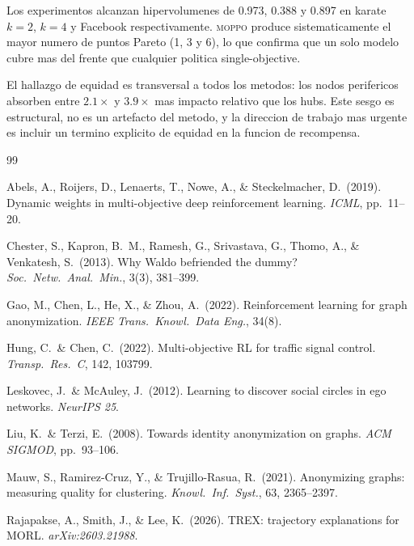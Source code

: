 \documentclass[10pt,twocolumn,letterpaper]{article}
\newcommand{\moppo}{\textsc{moppo}}
\begin{document}
Los experimentos alcanzan hipervolumenes de 0.973, 0.388 y 0.897 en karate $k=2$,
$k=4$ y Facebook respectivamente. \moppo{} produce sistematicamente el mayor numero
de puntos Pareto (1, 3 y 6), lo que confirma que un solo modelo cubre mas del frente
que cualquier politica single-objective.

El hallazgo de equidad es transversal a todos los metodos: los nodos perifericos
absorben entre $2.1\times$ y $3.9\times$ mas impacto relativo que los hubs. Este
sesgo es estructural, no es un artefacto del metodo, y la direccion de trabajo mas
urgente es incluir un termino explicito de equidad en la funcion de recompensa.


\begin{thebibliography}{99}
\small

Abels, A., Roijers, D., Lenaerts, T., Nowe, A., \& Steckelmacher, D.\ (2019).
Dynamic weights in multi-objective deep reinforcement learning.
\emph{ICML}, pp.\ 11--20.

Chester, S., Kapron, B.~M., Ramesh, G., Srivastava, G., Thomo, A., \&
Venkatesh, S.\ (2013).
Why Waldo befriended the dummy?
\emph{Soc.\ Netw.\ Anal.\ Min.}, 3(3), 381--399.

Gao, M., Chen, L., He, X., \& Zhou, A.\ (2022).
Reinforcement learning for graph anonymization.
\emph{IEEE Trans.\ Knowl.\ Data Eng.}, 34(8).

Hung, C.\ \& Chen, C.\ (2022).
Multi-objective RL for traffic signal control.
\emph{Transp.\ Res.\ C}, 142, 103799.

Leskovec, J.\ \& McAuley, J.\ (2012).
Learning to discover social circles in ego networks.
\emph{NeurIPS 25}.

Liu, K.\ \& Terzi, E.\ (2008).
Towards identity anonymization on graphs.
\emph{ACM SIGMOD}, pp.\ 93--106.

Mauw, S., Ramirez-Cruz, Y., \& Trujillo-Rasua, R.\ (2021).
Anonymizing graphs: measuring quality for clustering.
\emph{Knowl.\ Inf.\ Syst.}, 63, 2365--2397.

Rajapakse, A., Smith, J., \& Lee, K.\ (2026).
TREX: trajectory explanations for MORL.
\emph{arXiv:2603.21988}.


\end{thebibliography}
\end{document}
